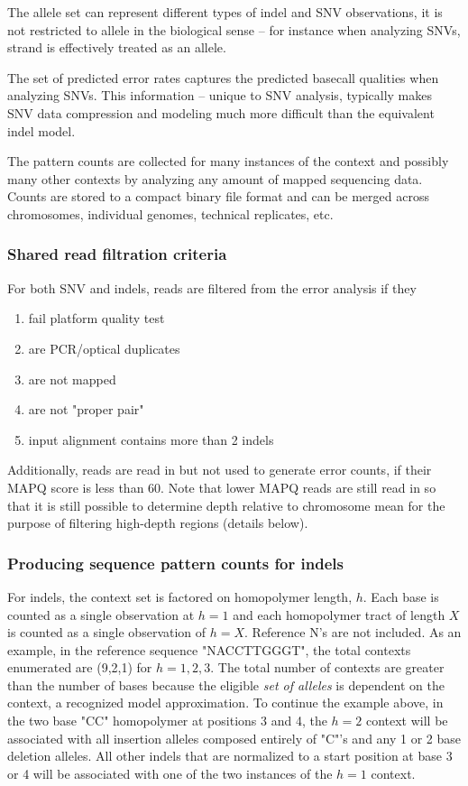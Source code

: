 \documentclass{article}
\begin{document}
The allele set can represent different types of indel and SNV observations, it is not restricted to allele in the biological sense -- for instance when analyzing SNVs, strand is effectively treated as an allele.

The set of predicted error rates captures the predicted basecall qualities when analyzing SNVs. This information -- unique to SNV analysis, typically makes SNV data compression and modeling much more difficult than the equivalent indel model.

The pattern counts are collected for many instances of the context and possibly many other contexts by analyzing any amount of mapped sequencing data. Counts are stored to a compact binary file format and can be merged across chromosomes, individual genomes, technical replicates, etc.

\subsubsection{Shared read filtration criteria}

For both SNV and indels, reads are filtered from the error analysis if they

\begin{enumerate}
\item fail platform quality test
\item are PCR/optical duplicates
\item are not mapped
\item are not "proper pair"
\item input alignment contains more than 2 indels
\end{enumerate}

Additionally, reads are read in but not used to generate error counts, if their MAPQ score is less than 60. Note that lower MAPQ reads are still read in so that it is still possible to determine depth relative to chromosome mean for the purpose of filtering high-depth regions (details below).

\subsubsection{Producing sequence pattern counts for indels}

For indels, the context set is factored on homopolymer length, $h$. Each base is counted as a single observation at $h=1$ and each homopolymer tract of length $X$ is counted as a single observation of $h=X$. Reference N's are not included. As an example, in the reference sequence "NACCTTGGGT", the total contexts enumerated are (9,2,1) for $h=1,2,3$. The total number of contexts are greater than the number of bases because the eligible \emph{set of alleles} is dependent on the context, a recognized model approximation. To continue the example above, in the two base "CC" homopolymer at positions 3 and 4, the $h=2$ context will be associated with all insertion alleles composed entirely of "C"'s and any 1 or 2 base deletion alleles. All other indels that are normalized to a start position at base 3 or 4 will be associated with one of the two instances of the $h=1$ context.
\end{document}
